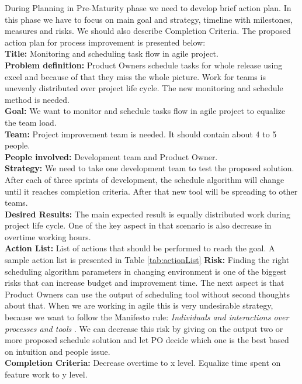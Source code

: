 During Planning in Pre-Maturity phase we need to develop brief action plan. In this phase we have to focus on main goal and strategy, timeline with milestones, measures and risks. We should also describe Completion Criteria. The proposed action plan for process improvement is presented below: \\
\textbf{Title:}  Monitoring and scheduling task flow in agile project.\\
\textbf{Problem definition:} Product Owners schedule tasks for whole release using excel and because of that they miss the whole picture. Work for teams is unevenly distributed over project life cycle. The new monitoring and schedule method is needed.\\
\textbf{Goal:}  We want to monitor and schedule tasks flow in agile project to equalize the team load.\\
\textbf{Team:} Project improvement team is needed. It should contain about 4 to 5 people.\\
\textbf{People involved:} Development team and Product Owner.\\
\textbf{Strategy:} We need to take one development team to test the proposed solution. After each of three sprints of development, the schedule algorithm will change until it reaches completion criteria. After that new tool will be spreading to other teams.\\
\textbf{Desired Results:} The main expected result is equally distributed work during project life cycle. One of the key aspect in that scenario is also decrease in overtime working hours.\\
\textbf{Action List:} List of actions that should be performed to reach the goal. A sample action list is presented in Table \ref{tab:actionList}
\textbf{Risk:} Finding the right scheduling algorithm parameters in changing environment is one of the biggest risks that can increase budget and improvement time. The next aspect is that Product Owners can use the output of scheduling tool without second thoughts about that. When we are working in agile this is very undesirable strategy, because we want to follow the Manifesto rule: \textit{Individuals and interactions over processes and tools} \cite{manifesto}. We can decrease this risk by giving on the output two or more proposed schedule solution and let PO decide which one is the best based on intuition and people issue. \\
\textbf{Completion Criteria:} Decrease overtime to x level. Equalize time spent on feature work to y level.

